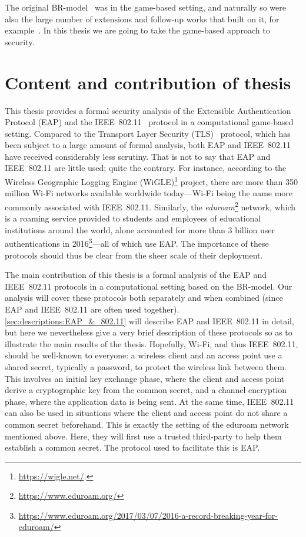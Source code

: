 The original BR-model~\cite{C:BelRog93} was in the game-based setting,
and naturally so were also the large number of extensions and follow-up works that built on it,
for example~\cite{STOC:BelRog95,Blake-WilsonM:1997:BR93_asymmetric,EC:BelPoiRog00,EC:CanKra01,PROVSEC:LaMLauMit07,C:JKSS12}.
In this thesis we are going to take the game-based approach to security.



\section{Content and contribution of thesis}


This thesis provides a formal security analysis of the Extensible Authentication Protocol (EAP) \cite{IETF:RFC3748:EAP} and the IEEE~802.11~\cite{IEEE:2012:802.11} protocol in a computational game-based setting.
Compared to the Transport Layer Security (TLS)~\cite{IETF:RFC5246:TLS} protocol,
which has been subject to a large amount of formal analysis,
both EAP and IEEE~802.11 have received considerably less scrutiny. 
That is not to say that EAP and IEEE~802.11 are little used;
quite the contrary.
For instance,
according to the Wireless Geographic Logging Engine (WiGLE)\footnote{\url{https://wigle.net/}.
} project,
there are more than 350 million Wi-Fi networks available worldwide today---Wi-Fi being the name more commonly associated with IEEE~802.11.
Similarly,
the \emph{eduroam}\footnote{\url{https://www.eduroam.org/}} network,
which is a roaming service provided to students and employees of educational institutions around the world,
alone accounted for more than 3 billion user authentications in 2016\footnote{\url{https://www.eduroam.org/2017/03/07/2016-a-record-breaking-year-for-eduroam/}
}---all of which use EAP.
The importance of these protocols should thus be clear from the sheer scale of their deployment.
  
The main contribution of this thesis is a formal analysis of the EAP and IEEE~802.11 protocols in a computational setting based on the BR-model.
Our analysis will cover these protocols both separately and when combined 
(since EAP and IEEE~802.11 are often used together). 
\cref{sec:descriptions:EAP_&_802.11} will describe EAP and IEEE~802.11 in detail,
but here we nevertheless give a very brief description of these protocols so as to illustrate the main results of the thesis.
Hopefully,
Wi-Fi,
and thus IEEE~802.11,
should be well-known to everyone:
a wireless client and an access point use a shared secret,
typically a password,
to protect the wireless link between them. 
This involves an initial key exchange phase,
where the client and access point derive a cryptographic key from the common secret,
and a channel encryption phase,
where the application data is being sent.
At the same time,
IEEE~802.11 can also be used in situations where the client and access point do not share a common secret beforehand.
This is exactly the setting of the eduroam network mentioned above.
Here,
they will first use a trusted third-party to help them establish a common secret.
The protocol used to facilitate this is EAP.

